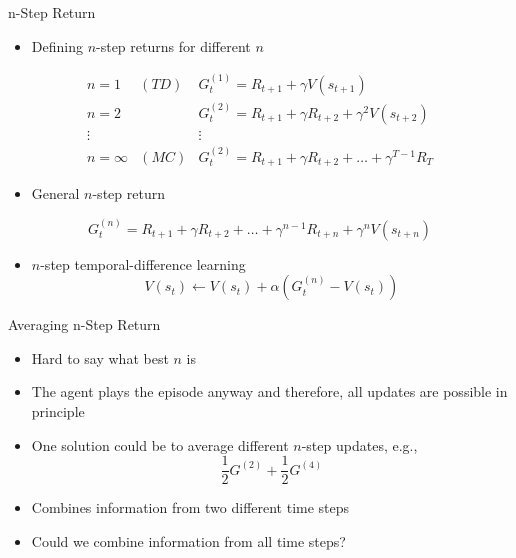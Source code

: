 \begin{frame}[c]{n-Step Return}
	
\begin{itemize}
	\item Defining $n$-step returns for different $n$
\end{itemize}

\begin{eqnarray}
n=1 & (TD) & G_t^{(1)} = R_{t+1} + \gamma V(s_{t+1})\nonumber\\
n=2 &  & G_t^{(2)} = R_{t+1} + \gamma R_{t+2} + \gamma^2 V(s_{t+2})\nonumber\\
\vdots & & \vdots\nonumber\\
n = \infty & (MC) & G_t^{(2)} = R_{t+1} + \gamma R_{t+2} + \ldots + \gamma^{T-1} R_T\nonumber
\end{eqnarray}

\begin{itemize}
	\item General $n$-step return
\end{itemize}

$$ G_t^{(n)} =  R_{t+1} + \gamma R_{t+2} + \ldots + \gamma^{n-1} R_{t+n} + \gamma^n V(s_{t+n})$$
	
\begin{itemize}
	\item $n$-step temporal-difference learning
	$$V(s_t) \gets V(s_t) + \alpha \left(G_t^{(n)} - V(s_t)\right) $$
\end{itemize}
	
\end{frame}
\begin{frame}[c]{Averaging n-Step Return}
	
	\begin{itemize}
		\item Hard to say what best $n$ is
		\item The agent plays the episode anyway and therefore, all updates are possible in principle
		\item One solution could be to average different $n$-step updates, e.g.,
		$$ \frac{1}{2}G^{(2)} + \frac{1}{2}G^{(4)}$$
		\item Combines information from two different time steps
		\item Could we combine information from all time steps?
	\end{itemize}
	
\end{frame}
